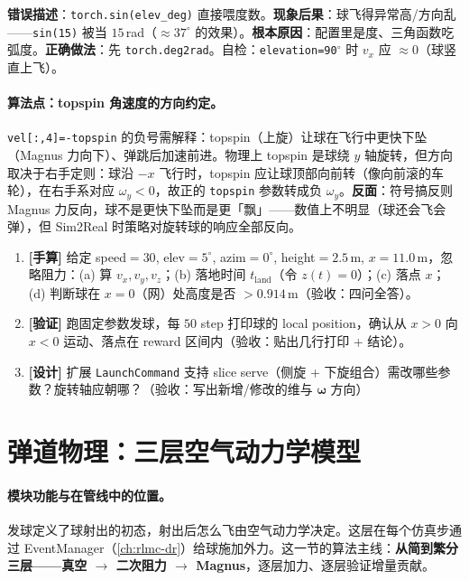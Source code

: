 \begin{pitfall}
\textbf{错误描述}：\verb|torch.sin(elev_deg)| 直接喂度数。\textbf{现象后果}：球飞得异常高/方向乱——\verb|sin(15)| 被当 $15$\,rad（$\approx37^\circ$ 的效果）。\textbf{根本原因}：配置里是度、三角函数吃弧度。\textbf{正确做法}：先 \verb|torch.deg2rad|。自检：\verb|elevation=90|$^\circ$ 时 $v_x$ 应 $\approx0$（球竖直上飞）。
\end{pitfall}

\paragraph{算法点：topspin 角速度的方向约定。}\verb|vel[:,4]=-topspin| 的负号需解释：topspin（上旋）让球在飞行中更快下坠（Magnus 力向下）、弹跳后加速前进。物理上 topspin 是球绕 $y$ 轴旋转，但方向取决于右手定则：球沿 $-x$ 飞行时，topspin 应让球顶部向前转（像向前滚的车轮），在右手系对应 $\omega_y<0$，故正的 \verb|topspin| 参数转成负 $\omega_y$。\textbf{反面}：符号搞反则 Magnus 力反向，球不是更快下坠而是更「飘」——数值上不明显（球还会飞会弹），但 Sim2Real 时策略对旋转球的响应全部反向。

\begin{practice}[本节动手任务]
\begin{enumerate}
  \item \textbf{[手算]} 给定 speed$=30$, elev$=5^\circ$, azim$=0^\circ$, height$=2.5$\,m, $x=11.0$\,m，忽略阻力：(a) 算 $v_x,v_y,v_z$；(b) 落地时间 $t_{\text{land}}$（令 $z(t)=0$）；(c) 落点 $x$；(d) 判断球在 $x=0$（网）处高度是否 $>0.914$\,m（验收：四问全答）。
  \item \textbf{[验证]} 跑固定参数发球，每 $50$ step 打印球的 local position，确认从 $x>0$ 向 $x<0$ 运动、落点在 reward 区间内（验收：贴出几行打印 + 结论）。
  \item \textbf{[设计]} 扩展 \verb|LaunchCommand| 支持 slice serve（侧旋 + 下旋组合）需改哪些参数？旋转轴应朝哪？（验收：写出新增/修改的维与 $\boldsymbol\omega$ 方向）
\end{enumerate}
\end{practice}

\section{弹道物理：三层空气动力学模型}
\label{sec:rlmc-tennis-aero}

\paragraph{模块功能与在管线中的位置。}发球定义了球射出的初态，射出后怎么飞由空气动力学决定。这层在每个仿真步通过 EventManager（\cref{ch:rlmc-dr}）给球施加外力。这一节的算法主线：\textbf{从简到繁分三层——真空 $\to$ 二次阻力 $\to$ Magnus}，逐层加力、逐层验证增量贡献。


